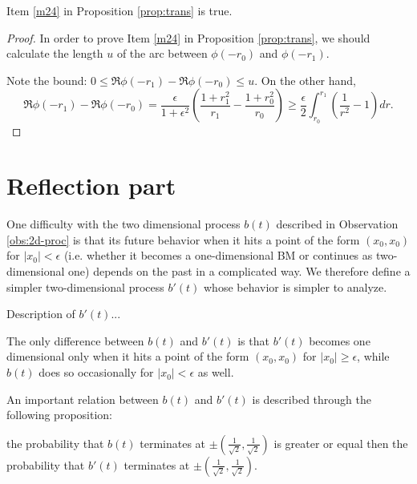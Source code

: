{\begin{cor}\label{m24true}
Item \ref{m24} in Proposition \ref{prop:trans} is true.
\end{cor}
\begin{proof}

In order to prove Item \ref{m24} in Proposition \ref{prop:trans}, we should calculate the length $u$ of the arc between $\phi(-r_0)$ and $\phi(-r_1)$.

Note the bound:
$0 \le \Re\phi(-r_1)-\Re\phi(-r_0) \le u$.
On the other hand,
\[\Re\phi(-r_1)-\Re\phi(-r_0)
=
\frac{\epsilon}{1+\epsilon^2}\left(\frac{1+r_1^2}{r_1}-\frac{1+r_0^2}{r_0}\right)
\ge\frac{\epsilon}{2} \int_{r_0}^{r_1} \left(\frac{1}{r^2}-1\right) dr.\]
\end{proof}

\section{Reflection part}
One difficulty with the two dimensional process $b(t)$ described in Observation \ref{obs:2d-proc} is that its future behavior when it hits a point of the form $(x_0,x_0)$ for $|x_0|<\epsilon$
 (i.e. whether it becomes a one-dimensional BM or continues as
  two-dimensional one) depends on the past in a complicated way. We therefore define a simpler two-dimensional process $b'(t)$ whose behavior is simpler to analyze.
\begin{definition}
  \label{def:2d-proc}
  Description of $b'(t)$...
  \FIXME{}{}
\end{definition}
   The only difference between $b(t)$ and $b'(t)$ is that $b'(t)$ becomes one dimensional only when it hits a point of
the form $(x_0,x_0)$ for $|x_0|\ge\epsilon$, while $b(t)$ does so occasionally for $|x_0|<\epsilon$ as well.

An important relation between $b(t)$ and $b'(t)$ is described through the
following proposition:

\begin{propos}\label{prop:refprop}
the probability that $b(t)$ terminates at
$\pm(\frac{1}{\sqrt2},\frac{1}{\sqrt2})$ is greater or equal then the
probability that $b'(t)$ terminates at
$\pm(\frac{1}{\sqrt2},\frac{1}{\sqrt2})$.
\end{propos}

}

